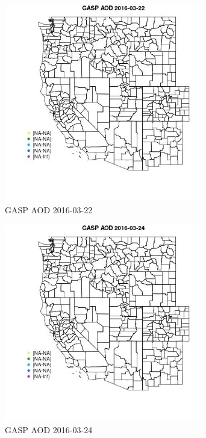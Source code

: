 \begin{figure} 
\centering  
\includegraphics[width=0.77\textwidth]{Code_Outputs/Report_ML_input_PM25_Step4_part_e_de_duplicated_aveswNAs_MapObsGASP_AOD2016-03-22.jpg} 
\caption{\label{fig:Report_ML_input_PM25_Step4_part_e_de_duplicated_aveswNAsMapObsGASP_AOD2016-03-22}GASP AOD 2016-03-22} 
\end{figure} 
 

\clearpage 

\begin{figure} 
\centering  
\includegraphics[width=0.77\textwidth]{Code_Outputs/Report_ML_input_PM25_Step4_part_e_de_duplicated_aveswNAs_MapObsGASP_AOD2016-03-24.jpg} 
\caption{\label{fig:Report_ML_input_PM25_Step4_part_e_de_duplicated_aveswNAsMapObsGASP_AOD2016-03-24}GASP AOD 2016-03-24} 
\end{figure} 
 

